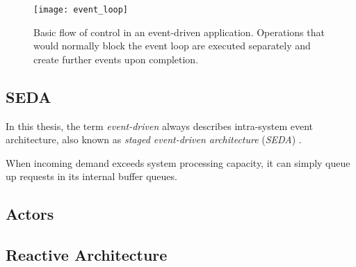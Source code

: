 \begin{figure}
\centering\small
\setlength{\tabcolsep}{0mm}
  \texttt{[image: event\_loop]}
\caption{
Basic flow of control in an event-driven application. Operations that would normally block the event loop are executed separately and create further events upon completion.
}
\label{fig:event_loop}
\end{figure}

\subsection{SEDA}

In this thesis, the term \textit{event-driven} always describes intra-system event architecture, also known as \textit{staged event-driven architecture} (\textit{SEDA}) \cite{event-architecture}.

When incoming demand exceeds system processing capacity, it can simply queue up requests in its internal buffer queues.

\subsection{Actors}

\subsection{Reactive Architecture}

























